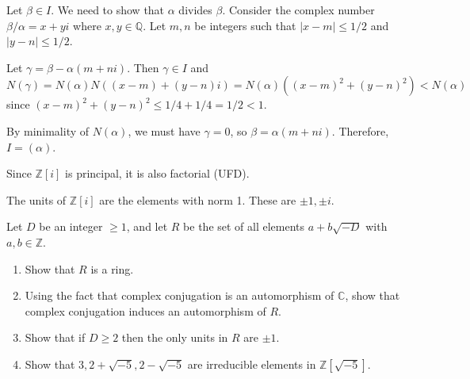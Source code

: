Let $\beta \in I$. We need to show that $\alpha$ divides $\beta$. Consider the complex number $\beta/\alpha = x + yi$ where $x, y \in \mathbb{Q}$. Let $m, n$ be integers such that $|x - m| \leq 1/2$ and $|y - n| \leq 1/2$.

Let $\gamma = \beta - \alpha(m + ni)$. Then $\gamma \in I$ and $N(\gamma) = N(\alpha)N((x-m) + (y-n)i) = N(\alpha)((x-m)^2 + (y-n)^2) < N(\alpha)$ since $(x-m)^2 + (y-n)^2 \leq 1/4 + 1/4 = 1/2 < 1$.

By minimality of $N(\alpha)$, we must have $\gamma = 0$, so $\beta = \alpha(m + ni)$. Therefore, $I = (\alpha)$.

Since $\mathbb{Z}[i]$ is principal, it is also factorial (UFD).

The units of $\mathbb{Z}[i]$ are the elements with norm 1. These are $\pm 1, \pm i$.

\begin{problembox}
Let $D$ be an integer $\geq 1$, and let $R$ be the set of all elements $a + b\sqrt{-D}$ with $a, b \in \mathbb{Z}$.
\begin{enumerate}[label=(\alph*)]
    \item Show that $R$ is a ring.
    \item Using the fact that complex conjugation is an automorphism of $\mathbb{C}$, show that complex conjugation induces an automorphism of $R$.
    \item Show that if $D \geq 2$ then the only units in $R$ are $\pm 1$.
    \item Show that $3, 2 + \sqrt{-5}, 2 - \sqrt{-5}$ are irreducible elements in $\mathbb{Z}[\sqrt{-5}]$.
\end{enumerate}
\end{problembox}


